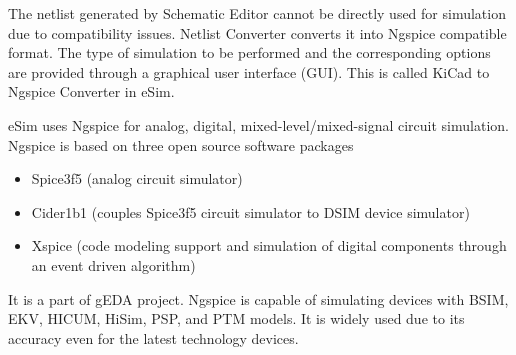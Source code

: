 The netlist generated by Schematic Editor cannot be directly used
for simulation due to compatibility issues. Netlist Converter converts
it into Ngspice compatible format. The type of simulation
to be performed and the corresponding options are
provided through a graphical user interface (GUI). This is called
KiCad to Ngspice Converter in eSim. 

eSim uses Ngspice for analog, digital, mixed-level/mixed-signal circuit
simulation. Ngspice is based on three open source software
packages%
\begin{itemize}
\item Spice3f5 (analog circuit simulator) 
\item Cider1b1 (couples Spice3f5 circuit simulator to DSIM device simulator)
\item Xspice (code modeling support and simulation of digital components through an event driven algorithm)
\end{itemize}
It is a part of gEDA  project. Ngspice is capable of
simulating devices with BSIM,  EKV,  HICUM, 
 HiSim,  PSP,  and PTM 
models. It is widely used due to its accuracy even for the latest
technology devices.
